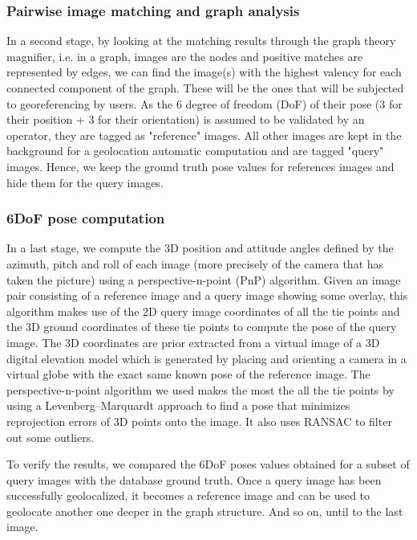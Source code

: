 \documentclass[fleqn,10pt,lineno]{wlpeerj} %
\begin{document}
\subsubsection*{Pairwise image matching and graph analysis}
In a second stage,
by looking at the matching results through the graph theory magnifier, i.e. 
in a graph, images are the nodes and positive matches are represented by edges, 
we can find the image(s) with the highest valency for each connected component 
of the graph.
These will be the ones that will be subjected to georeferencing by users. 
As the 6 degree of freedom (DoF) of their pose (3 for their position + 3 for 
their orientation) is assumed to be validated by an operator, they are tagged as 
"reference" images. 
All other images are kept in the background for a geolocation automatic computation
and are tagged "query" images.
Hence, we keep the ground truth pose values for references images and hide them 
for the query images.

\subsubsection*{6DoF pose computation}
In a last stage, 
we compute the 3D position and attitude angles defined by the azimuth, pitch
and roll of each image (more precisely of the camera that has taken the 
picture) using a perspective-n-point (PnP) algorithm. Given an image pair consisting
of a reference image and a query image showing some overlay, this algorithm makes 
use of the 2D query image coordinates of all the tie points and the 3D ground 
coordinates of these tie points to compute the pose of the query image. 
The 3D coordinates are prior extracted from a virtual image of a 3D digital 
elevation model which is generated by placing and orienting a camera in
a virtual globe with the exact same known pose of the reference image.
The perspective-n-point algorithm we used makes the most the all the tie points
by using a Levenberg–Marquardt approach to find a pose that minimizes reprojection 
errors of 3D points onto the image. It also uses RANSAC to filter out some outliers.

To verify the results, we compared the 6DoF poses values obtained for a subset 
of query images with the database ground truth. Once a query image has been
successfully geolocalized, it becomes a reference image and can be used to geolocate
another one deeper in the graph structure. And so on, until to the last image.
\end{document}
